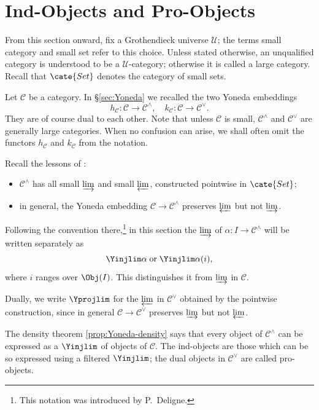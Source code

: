 \section{Ind-Objects and Pro-Objects}\label{sec:ind-pro}
From this section onward, fix a Grothendieck universe $\mathcal{U}$; the terms small category and small set refer to this choice. Unless stated otherwise, an unqualified category is understood to be a $\mathcal{U}$-category; otherwise it is called a large category. Recall that $\cate{Set}$ denotes the category of small sets.

Let $\mathcal{C}$ be a category. In \S\ref{sec:Yoneda} we recalled the two Yoneda embeddings
\[ h_{\mathcal{C}}: \mathcal{C}\to \mathcal{C}^\wedge, \quad k_{\mathcal{C}}: \mathcal{C} \to \mathcal{C}^\vee. \]
They are of course dual to each other. Note that unless $\mathcal{C}$ is small, $\mathcal{C}^\wedge$ and $\mathcal{C}^\vee$ are generally large categories. When no confusion can arise, we shall often omit the functors $h_{\mathcal{C}}$ and $k_{\mathcal{C}}$ from the notation.

Recall the lessons of \cite[Propositions 2.7.8, 2.7.9]{Li1}:
\begin{itemize}
	\item $\mathcal{C}^\wedge$ has all small $\varinjlim$ and small $\varprojlim$, constructed pointwise in $\cate{Set}$;
	\item in general, the Yoneda embedding $\mathcal{C}\to\mathcal{C}^\wedge$ preserves $\varprojlim$ but not $\varinjlim$.
\end{itemize}
Following the convention there,\footnote{This notation was introduced by P.\ Deligne.} in this section the $\varinjlim$ of $\alpha:I\to\mathcal{C}^\wedge$ will be written separately as
\[ \Yinjlim \alpha \;\text{or}\; \Yinjlim \alpha(i), \]
where $i$ ranges over $\Obj(I)$. This distinguishes it from $\varinjlim$ in $\mathcal{C}$.

Dually, we write $\Yprojlim$ for the $\varprojlim$ in $\mathcal{C}^\vee$ obtained by the pointwise construction, since in general $\mathcal{C}\to\mathcal{C}^\vee$ preserves $\varinjlim$ but not $\varprojlim$.

The density theorem \ref{prop:Yoneda-density} says that every object of $\mathcal{C}^\wedge$ can be expressed as a $\Yinjlim$ of objects of $\mathcal{C}$. The ind-objects are those which can be so expressed using a filtered $\Yinjlim$; the dual objects in $\mathcal{C}^\vee$ are called pro-objects.

